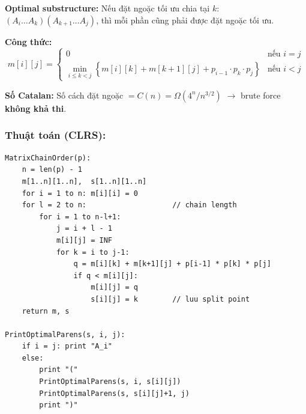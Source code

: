 \documentclass[10pt]{article}
\begin{document}
\textbf{Optimal substructure:} Nếu đặt ngoặc tối ưu chia tại \(k\):
\((A_i \ldots A_k)(A_{k+1} \ldots A_j)\), thì mỗi phần cũng phải được
đặt ngoặc tối ưu.

\textbf{Công thức:}
\[
m[i][j] = \begin{cases} 0 & \text{nếu } i = j \\ \displaystyle\min_{i \leq k < j} \left\{ m[i][k] + m[k+1][j] + p_{i-1} \cdot p_k \cdot p_j \right\} & \text{nếu } i < j \end{cases}
\]

\textbf{Số Catalan:} Số cách đặt ngoặc
\(= C(n) = \Omega(4^n / n^{3/2})\) \(\to\) brute force \textbf{không khả
thi}.

\subsubsection{Thuật toán (CLRS):}\label{thuux1eadt-touxe1n-clrs}

\begin{tcolorbox}[colback=gray!8, colframe=gray!50, boxrule=0.5pt, arc=2pt,
  left=6pt, right=6pt, top=4pt, bottom=4pt,
  title={\small\textbf{Pseudocode 20: Matrix Chain Multiplication}}]
\begin{verbatim}
MatrixChainOrder(p):
    n = len(p) - 1
    m[1..n][1..n],  s[1..n][1..n]
    for i = 1 to n: m[i][i] = 0
    for l = 2 to n:                    // chain length
        for i = 1 to n-l+1:
            j = i + l - 1
            m[i][j] = INF
            for k = i to j-1:
                q = m[i][k] + m[k+1][j] + p[i-1] * p[k] * p[j]
                if q < m[i][j]:
                    m[i][j] = q
                    s[i][j] = k        // luu split point
    return m, s

PrintOptimalParens(s, i, j):
    if i = j: print "A_i"
    else:
        print "("
        PrintOptimalParens(s, i, s[i][j])
        PrintOptimalParens(s, s[i][j]+1, j)
        print ")"
\end{verbatim}
\end{tcolorbox}
\end{document}
